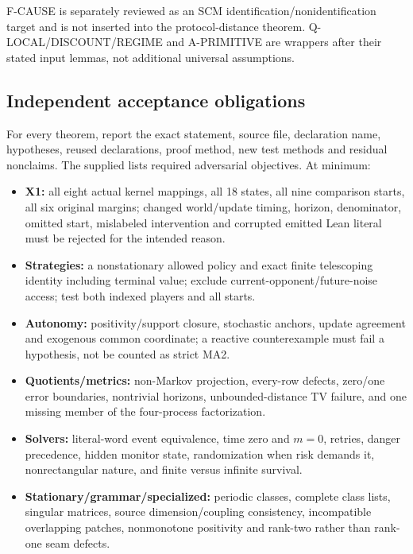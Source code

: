 \documentclass[
  11pt,
  a4paper,
]{article}
\providecommand{\tightlist}{%
  \setlength{\itemsep}{0pt}\setlength{\parskip}{0pt}}
\newcommand{\codewrap}[1]{{\ttfamily\seqsplit{#1}}}
\begin{document}
F-CAUSE is separately reviewed as an SCM
identification/nonidentification target and is not inserted into the
protocol-distance theorem. Q-LOCAL/DISCOUNT/REGIME and A-PRIMITIVE are
wrappers after their stated input lemmas, not additional universal
assumptions.

\subsection{Independent acceptance
obligations}\label{independent-acceptance-obligations}

For every theorem, report the exact statement, source file, declaration
name, hypotheses, reused declarations, proof method, new test methods
and residual nonclaims. The supplied
\codewrap{registries/acceptance\_tests.json} lists required adversarial
objectives. At minimum:

\begin{itemize}
\tightlist
\item
  \textbf{X1:} all eight actual kernel mappings, all 18 states, all nine
  comparison starts, all six original margins; changed world/update
  timing, horizon, denominator, omitted start, mislabeled intervention
  and corrupted emitted Lean literal must be rejected for the intended
  reason.
\item
  \textbf{Strategies:} a nonstationary allowed policy and exact finite
  telescoping identity including terminal value; exclude
  current-opponent/future-noise access; test both indexed players and
  all starts.
\item
  \textbf{Autonomy:} positivity/support closure, stochastic anchors,
  update agreement and exogenous common coordinate; a reactive
  counterexample must fail a hypothesis, not be counted as strict MA2.
\item
  \textbf{Quotients/metrics:} non-Markov projection, every-row defects,
  zero/one error boundaries, nontrivial horizons, unbounded-distance TV
  failure, and one missing member of the four-process factorization.
\item
  \textbf{Solvers:} literal-word event equivalence, time zero and
  \(m=0\), retries, danger precedence, hidden monitor state,
  randomization when risk demands it, nonrectangular nature, and finite
  versus infinite survival.
\item
  \textbf{Stationary/grammar/specialized:} periodic classes, complete
  class lists, singular matrices, source dimension/coupling consistency,
  incompatible overlapping patches, nonmonotone positivity and rank-two
  rather than rank-one seam defects.
\end{itemize}
\end{document}
